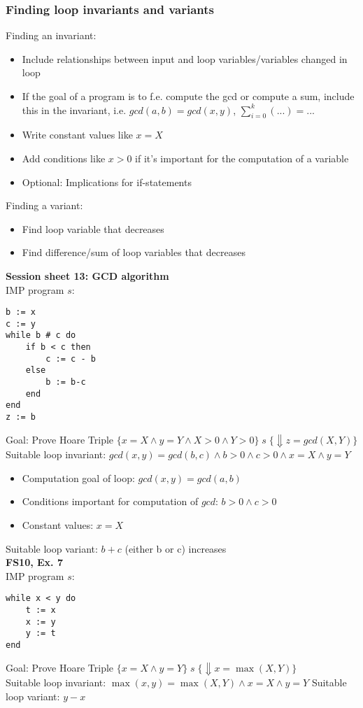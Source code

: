 \documentclass[11.5pt]{article}
\begin{document}
\subsubsection{Finding loop invariants and variants}
Finding an invariant: \begin{itemize}
    \item Include relationships between input and loop variables/variables changed in loop
    \item If the goal of a program is to f.e. compute the gcd or compute a sum, include
    this in the invariant, i.e. $gcd(a,b)=gcd(x,y)$, $\sum_{i=0}^{k}(...)=...$
    \item Write constant values like $x=X$
    \item Add conditions like $x>0$ if it's important for the computation of a variable
    \item Optional: Implications for if-statements
\end{itemize}
Finding a variant:
\begin{itemize}
    \item Find loop variable that decreases
    \item Find difference/sum of loop variables that decreases
\end{itemize}
\smallskip
\textbf{Session sheet 13: GCD algorithm} \\
IMP program $s$:
\begin{verbatim}
b := x
c := y
while b # c do
    if b < c then
        c := c - b
    else
        b := b-c
    end
end
z := b
\end{verbatim}
Goal: Prove Hoare Triple 
$\{x=X \land y=Y\land X > 0 \land Y >0\} \; s \; \{\Downarrow z=gcd(X,Y)\}$ \\
Suitable loop invariant: $gcd(x,y)=gcd(b,c) \land b >0 \land c > 0 \land x=X \land y=Y$ 
\begin{itemize}
    \item Computation goal of loop: $gcd(x,y) = gcd(a,b)$
    \item Conditions important for computation of $gcd$: $b>0 \land c > 0$
    \item Constant values: $x=X$
\end{itemize}
Suitable loop variant: $b+c$ (either b or c) increases
 \smallskip \\
\textbf{FS10, Ex. 7} \\
IMP program $s$:
\begin{verbatim}
while x < y do
    t := x
    x := y
    y := t
end
\end{verbatim}
Goal: Prove Hoare Triple $\{x=X \land y=Y\} \; s \; \{\Downarrow x = \max(X,Y)\}$ \\
Suitable loop invariant: $\max(x,y)=\max(X,Y) \land x=X \land y=Y$
Suitable loop variant: $y-x$ 
\end{document}
